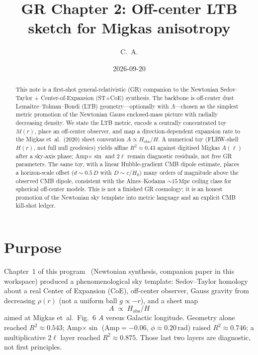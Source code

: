 \documentclass[11pt,a4paper]{article}
\title{GR Chapter 2: Off-center LTB sketch for Migkas anisotropy}
\author{C.\ A.}
\date{2026-09-20}
\begin{document}
\maketitle

\begin{abstract}
This note is a first-shot general-relativistic (GR) companion to the Newtonian
Sedov--Taylor + Center-of-Expansion (ST+CoE) synthesis. The backbone is
off-center dust Lema\^itre--Tolman--Bondi (LTB) geometry---optionally with
$\Lambda$---chosen as the simplest metric promotion of the Newtonian Gauss
enclosed-mass picture with radially decreasing density. We state the LTB
metric, encode a centrally concentrated toy $M(r)$, place an off-center
observer, and map a direction-dependent expansion rate to the Migkas
et~al.\ (2020) sheet convention $A\propto H_{\mathrm{obs}}/H$. A numerical
toy (FLRW-shell $H(r)$, not full null geodesics) yields affine
$R^2\approx0.43$ against digitised Migkas $A(\ell)$ after a sky-axis phase;
Amp$\times\sin$ and $2\ell$ remain diagnostic residuals, not free GR
parameters. The same toy, with a linear Hubble-gradient CMB dipole estimate,
places a horizon-scale offset ($d\sim0.5\,D$ with $D\sim c/H_0$) many orders
of magnitude above the observed CMB dipole, consistent with the
Alnes--Kodama $\sim15\,\mathrm{Mpc}$ ceiling class for spherical off-center
models. This is not a finished GR cosmology; it is an honest promotion of the
Newtonian sky template into metric language and an explicit CMB kill-shot
ledger.
\end{abstract}

\tableofcontents
\newpage

\section{Purpose}
\label{sec:purpose}

Chapter~1 of this program~\citep{Migkas2020} (Newtonian synthesis, companion
paper in this workspace) produced a phenomenological sky template: Sedov--Taylor
homology about a real Center of Expansion (CoE), off-center observer, Gauss
gravity from decreasing $\rho(r)$ (not a uniform ball $g\propto -r$), and a
sheet map
\begin{equation}
  A\;\propto\; H_{\mathrm{obs}}/H
  \label{eq:sheetAF}
\end{equation}
aimed at Migkas et~al.\ Fig.~6 $A$ versus Galactic longitude. Geometry alone
reached $R^2\approx0.543$; Amp$\times\sin$ (Amp$=-0.06$, $\phi\approx0.20\,\mathrm{rad}$)
raised $R^2\approx0.746$; a multiplicative $2\ell$ layer reached
$R^2\approx0.875$. Those last two layers are diagnostic, not first principles.
\end{document}

